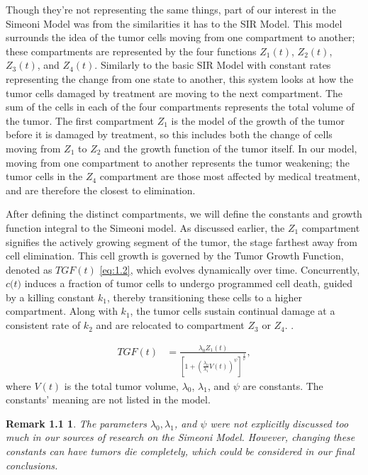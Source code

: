 \documentclass[11pt]{amsart}
\newtheorem*{remark}{Remark 1.1}
\begin{document}
Though they're not representing the same things, part of our interest in the Simeoni Model was from the similarities it has to the SIR Model. This model surrounds the idea of the tumor cells moving from one compartment to another; these compartments are represented by the four functions $Z_1(t)$, $Z_2(t)$, $Z_3(t)$, and $Z_4(t)$. Similarly to the basic SIR Model with constant rates representing the change from one state to another, this system looks at how the tumor cells damaged by treatment are moving to the next compartment. The sum of the cells in each of the four compartments represents the total volume of the tumor. The first compartment $Z_1$ is the model of the growth of the tumor before it is damaged by treatment, so this includes both the change of cells moving from $Z_1$ to $Z_2$ and the growth function of the tumor itself. In our model, moving from one compartment to another represents the tumor weakening; the tumor cells in the $Z_4$ compartment are those most affected by medical treatment, and are therefore the closest to elimination. 

After defining the distinct compartments, we will define the constants and growth function integral to the Simeoni model. As discussed earlier, the $Z_1$ compartment signifies the actively growing segment of the tumor, the stage farthest away from cell elimination. This cell growth is governed by the Tumor Growth Function, denoted as $TGF(t)$ \ref{eq:1.2}, which evolves dynamically over time. Concurrently, $c$$($$t$$)$ induces a fraction of tumor cells to undergo programmed cell death, guided by a killing constant 
$k_1$, thereby transitioning these cells to a higher compartment. Along with $k_1$,  the tumor cells sustain continual damage at a consistent rate of $k_2$ and are relocated to compartment $Z_3$ or $Z_4$. \cite{Koziol_Falls_Schnitzer_2020}.


\begin{equation} \label{eq:1.2}
\begin{aligned}
    TGF(t) &= \frac{\lambda_0Z_1(t)}{[1 + (\frac{\lambda_0}{\lambda_1}V(t))^\psi]^\frac{1}{\psi}}, 
\end{aligned}
\tag*{(1.2)}
\end{equation}
\qquad where $V(t)$ is the total tumor volume, $\lambda_0$, $\lambda_1$, and $\psi$ are constants. The constants' meaning are not listed in the model. 

\begin{remark}
    The parameters $\lambda_0, \lambda_1$, and $\psi$ were not explicitly discussed too much in our sources of research on the Simeoni Model. However, changing these constants can have tumors die completely, which could be considered in our final conclusions.
\end{remark}
\end{document}
